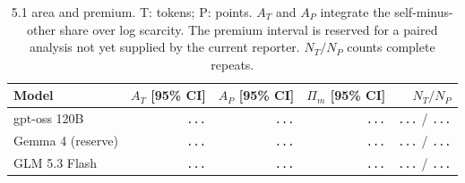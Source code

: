 \begin{table}[H]
\centering\footnotesize
\setlength{\tabcolsep}{4pt}
\caption{5.1 area and premium. T: tokens; P: points. $A_T$ and $A_P$ integrate the self-minus-other share over log scarcity. The premium interval is reserved for a paired analysis not yet supplied by the current reporter. $N_T/N_P$ counts complete repeats.}
\label{tab:e51-results}
\begin{tabular}{@{}lrrrr@{}}
\toprule
Model & $A_T$ [95\% CI] & $A_P$ [95\% CI] & $\Pi_m$ [95\% CI] & $N_T/N_P$ \\
\midrule
gpt-oss 120B & {\color{gray}\texttt{...}} & {\color{gray}\texttt{...}} & {\color{gray}\texttt{...}} & {\color{gray}\texttt{...}} / {\color{gray}\texttt{...}} \\
Gemma 4 (reserve) & {\color{gray}\texttt{...}} & {\color{gray}\texttt{...}} & {\color{gray}\texttt{...}} & {\color{gray}\texttt{...}} / {\color{gray}\texttt{...}} \\
GLM 5.3 Flash & {\color{gray}\texttt{...}} & {\color{gray}\texttt{...}} & {\color{gray}\texttt{...}} & {\color{gray}\texttt{...}} / {\color{gray}\texttt{...}} \\
\bottomrule
\end{tabular}
\end{table}
